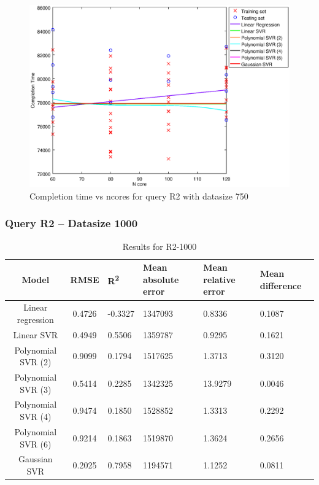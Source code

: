 \documentclass[a4paper,11pt]{article}
\begin{document}
\begin {figure}[hbtp]
\centering
\includegraphics[width=\textwidth]{output/R2_750_ONLY_1_LINEAR_NCORE/plot_R2_750.eps}
\caption{Completion time vs ncores for query R2 with datasize 750}
\label{fig:coreonly_linear_R2_750}
\end {figure}

\newpage
\subsubsection{Query R2 -- Datasize 1000}
\begin{table}[H]
	\centering
	\begin{adjustbox}{center}
		\begin{tabular}{c | c M{1.2cm} M{2.5cm} M{2.5cm} M{1.8cm}}
			Model & RMSE & R\textsuperscript{2} & Mean absolute error & Mean relative error & Mean difference \tabularnewline
			\hline
			Linear regression & 0.4726 & -0.3327 & 1347093 & 0.8336 & 0.1087 \\
			Linear SVR & 0.4949 & 0.5506 & 1359787 & 0.9295 & 0.1621 \\
			Polynomial SVR (2) & 0.9099 & 0.1794 & 1517625 & 1.3713 & 0.3120 \\
			Polynomial SVR (3) & 0.5414 & 0.2285 & 1342325 & 13.9279 & 0.0046 \\
			Polynomial SVR (4) & 0.9474 & 0.1850 & 1528852 & 1.3313 & 0.2292 \\
			Polynomial SVR (6) & 0.9214 & 0.1863 & 1519870 & 1.3624 & 0.2656 \\
			Gaussian SVR & 0.2025 & 0.7958 & 1194571 & 1.1252 & 0.0811 \\
		\end{tabular}
	\end{adjustbox}
	\\
	\caption{Results for R2-1000}
	\label{fig:coreonly_linear_R2_1000}
\end{table}
\end{document}
